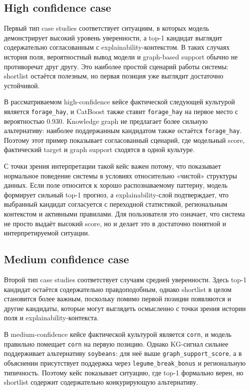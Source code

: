 

\subsection{High confidence case}

Первый тип case studies соответствует ситуациям, в которых модель демонстрирует высокий уровень уверенности, а top-1
кандидат выглядит содержательно согласованным с explainability-контекстом. В таких случаях история поля, вероятностный
вывод модели и graph-based support обычно не противоречат друг другу. Это наиболее простой сценарий работы системы:
shortlist остаётся полезным, но первая позиция уже выглядит достаточно устойчивой.

В рассматриваемом high-confidence кейсе фактической следующей культурой является \texttt{forage\_hay}, и CatBoost также
ставит \texttt{forage\_hay} на первое место с вероятностью 0.930. Knowledge graph не предлагает более сильную
альтернативу: наиболее поддержанным кандидатом также остаётся \texttt{forage\_hay}. Поэтому этот пример показывает
согласованный сценарий, где модельный score, фактический target и graph support сходятся в одной культуре.

С точки зрения интерпретации такой кейс важен потому, что показывает нормальное поведение системы в условиях
относительно «чистой» структуры данных. Если поле относится к хорошо распознаваемому паттерну, модель формирует сильный
top-1 прогноз, а explainability-слой подтверждает, что выбранный кандидат согласуется с переходной статистикой,
региональным контекстом и активными правилами. Для пользователя это означает, что система не просто выдаёт высокий
score, но и делает это в достаточно понятной и интерпретируемой ситуации.

\subsection{Medium confidence case}

Второй тип case studies соответствует случаям средней уверенности. Здесь top-1 кандидат остаётся содержательно
правдоподобным, однако shortlist в целом становится более важным, поскольку помимо первой позиции появляются и другие
кандидаты, которые могут выглядеть осмысленно с точки зрения истории поля и explainability-контекста.

В medium-confidence кейсе фактической культурой является \texttt{corn}, и модель правильно помещает \texttt{corn} на
первую позицию. Однако KG-сигнал сильнее поддерживает альтернативу \texttt{soybeans}: для неё выше
\texttt{graph\_support\_score}, а в объяснении присутствует поддержка через \texttt{legume\_break\_bonus} и региональную
типичность. Поэтому кейс показывает ситуацию, где top-1 формально верен, но shortlist содержит содержательно
конкурирующую альтернативу.

